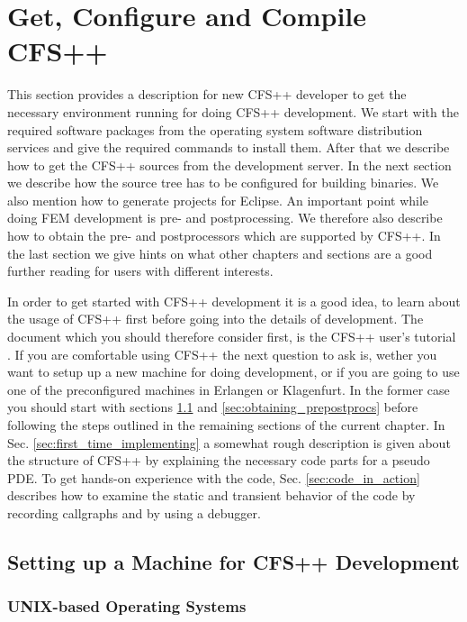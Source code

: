 \chapter{Get, Configure and Compile CFS++}
This  section provides  a  description  for new  CFS++  developer  to get  the
necessary environment running  for doing CFS++ development. We  start with the
required  software packages  from the  operating system  software distribution
services  and give  the  required  commands to  install  them.  After that  we
describe how  to get the  CFS++ sources from  the development server.   In the
next section we describe how the source tree has to be configured for building
binaries.  We also mention how to  generate projects for Eclipse. An important
point while  doing FEM  development is pre-  and postprocessing.  We therefore
also describe how to obtain the pre- and postprocessors which are supported by
CFS++.  In the last section we give  hints on what other chapters and sections
are a good further reading for users with different interests.

In order  to get started with  CFS++ development it  is a good idea,  to learn
about  the   usage  of   CFS++  first  before   going  into  the   details  of
development. The  document which you  should therefore consider first,  is the
CFS++ user's tutorial \cite{Simkovics2010}. If you are comfortable using CFS++
the next  question to ask is,  wether you want to  setup up a  new machine for
doing  development, or  if  you are  going  to use  one  of the  preconfigured
machines in Erlangen or Klagenfurt.  In  the former case you should start with
sections  \ref{sec:list_of_ext_packages}  and \ref{sec:obtaining_prepostprocs}
before following the  steps outlined in the remaining  sections of the current
chapter.    In  Sec.    \ref{sec:first_time_implementing}  a   somewhat  rough
description is given about the  structure of CFS++ by explaining the necessary
code parts for  a pseudo PDE.  To get hands-on experience  with the code, Sec.
\ref{sec:code_in_action}  describes how  to examine  the static  and transient
behavior of the code by recording callgraphs and by using a debugger.

\section{Setting up a Machine for CFS++ Development}
\label{sec:list_of_ext_packages}

\subsection{UNIX-based Operating Systems}

